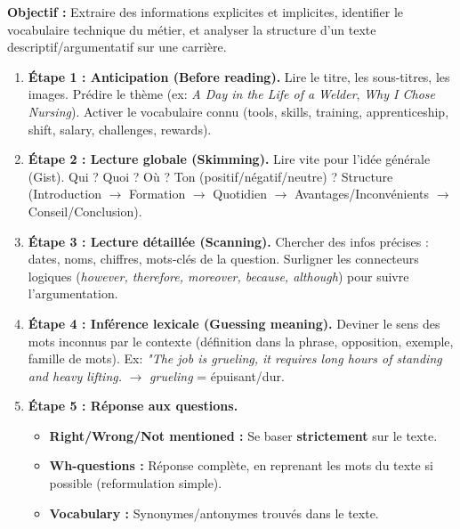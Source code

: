 \documentclass[11pt]{article}
\newcommand{\cle}[1]{{\popxbold\color{popdark}#1}}
\begin{document}
\begin{methode}
    \textbf{Objectif :} Extraire des informations explicites et implicites, identifier le vocabulaire technique du métier, et analyser la structure d'un texte descriptif/argumentatif sur une carrière.
    \begin{enumerate}
        \item \textbf{Étape 1 : Anticipation (Before reading).} Lire le titre, les sous-titres, les images. Prédire le thème (ex: \emph{A Day in the Life of a Welder}, \emph{Why I Chose Nursing}). Activer le vocabulaire connu (\cle{tools}, \cle{skills}, \cle{training}, \cle{apprenticeship}, \cle{shift}, \cle{salary}, \cle{challenges}, \cle{rewards}).
        \item \textbf{Étape 2 : Lecture globale (Skimming).} Lire vite pour l'idée générale (Gist). Qui ? Quoi ? Où ? Ton (positif/négatif/neutre) ? Structure (Introduction $\rightarrow$ Formation $\rightarrow$ Quotidien $\rightarrow$ Avantages/Inconvénients $\rightarrow$ Conseil/Conclusion).
        \item \textbf{Étape 3 : Lecture détaillée (Scanning).} Chercher des infos précises : dates, noms, chiffres, mots-clés de la question. Surligner les \cle{connecteurs logiques} (\emph{however, therefore, moreover, because, although}) pour suivre l'argumentation.
        \item \textbf{Étape 4 : Inférence lexicale (Guessing meaning).} Deviner le sens des mots inconnus par le contexte (définition dans la phrase, opposition, exemple, famille de mots). Ex: \emph{"The job is \cle{grueling}, \emph{it requires long hours of standing and heavy lifting}.} $\rightarrow$ \emph{grueling} = épuisant/dur.
        \item \textbf{Étape 5 : Réponse aux questions.}
              \begin{itemize}
                  \item \textbf{Right/Wrong/Not mentioned :} Se baser \textbf{strictement} sur le texte.
                  \item \textbf{Wh-questions :} Réponse complète, en reprenant les mots du texte si possible (reformulation simple).
                  \item \textbf{Vocabulary :} Synonymes/antonymes trouvés dans le texte.
              \end{itemize}
    \end{enumerate}
\end{methode}
\end{document}
